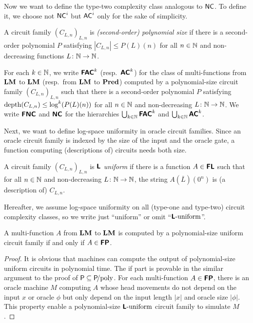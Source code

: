 \documentclass[envcountsame,orivec,oribibl]{llncs}
\begin{document}
Now we want to define the type-two complexity class analogous to $\mathsf{NC}$.
To define it, we choose not $\mathsf{NC}^i$ but $\mathsf{AC}^i$ 
only for the sake of simplicity.

A circuit family $(C_{L,n})_{L,n}$ is \emph{(second-order) polynomial size}
if there is a second-order polynomial $P$ satisfying
$|C_{L,n}| \le P(L)(n)$ for all $n \in \mathbb N$ and non-decreasing functions
$L \colon \mathbb N \to \mathbb N$.


\begin{definition}
 For each $k \in \mathbb N$, 
 we write $\text{\bfseries \sffamily \upshape FAC}^k$ (resp.\ $\text{\bfseries \sffamily \upshape AC}^k$) for the class of 
 multi-functions from $\mathbf{LM}$ to $\mathbf{LM}$ (resp.\ from $\mathbf{LM}$ to $\mathbf{Pred}$) computed by
 a polynomial-size circuit family $(C_{L,n})_{L,n}$ such that
 there is a second-order polynomial $P$ satisfying
 $\mathop{\rm depth}(C_{L,n}) \le \log^k(P(L)(n))$ 
 for all $n \in \mathbb N$ and non-decreasing
 $L \colon \mathbb N \to \mathbb N$.
 We write $\text{\bfseries \sffamily \upshape FNC}$ and $\text{\bfseries \sffamily \upshape NC}$ for the hierarchies
 $\bigcup_{k \in \mathbb N} \text{\bfseries \sffamily \upshape FAC}^k$ and $\bigcup_{k \in \mathbb N} \text{\bfseries \sffamily \upshape AC}^k$.
\end{definition}

Next, we want to define log-space uniformity in oracle circuit families.
Since an oracle circuit family is indexed by the size of the input and the oracle gate,
a function computing (descriptions of) circuits needs both size.

\begin{definition}
A circuit family $(C_{L,n})_{L,n}$ is \emph{$\text{\bfseries \sffamily \upshape L}$ uniform} if there is a function $A \in \text{\bfseries \sffamily \upshape FL}$ 
such that for all $n \in \mathbb N$ and non-decreasing $L \colon \mathbb N \to \mathbb N$, 
the string $A (\overline L) (0^n)$ is (a description of) $C_{L,n}$. 
\end{definition}

Hereafter, we assume log-space uniformity on all (type-one and type-two) 
circuit complexity classes, so we write just ``uniform'' or omit ``$\text{\bfseries \sffamily \upshape L}\text{-uniform}$''.

\begin{theorem}
\label{theorem:P-equals-L-uniform-P-poly}
A multi-function $A$ from $\mathbf{LM}$ to $\mathbf{LM}$ is computed by a polynomial-size
uniform circuit family if and only if $A \in \text{\bfseries \sffamily \upshape FP}$.
\end{theorem}

\begin{proof}
 It is obvious that machines can compute the output of
 polynomial-size uniform circuits in polynomial time.
 The if part is provable in the similar argument to the proof of
 $\mathsf{P} \subseteq \mathsf{P}\!\text{/poly}$.
 For each multi-function $A \in \text{\bfseries \sffamily \upshape FP}$, there is an oracle machine $M$
 computing $A$ whose head movements do not depend on the input $x$ or oracle
 $\phi$ but only depend on the input length $|x|$ and oracle size $|\phi|$.
 This property enable a polynomial-size $\text{\bfseries \sffamily \upshape L}\text{-uniform}$ circuit family to simulate $M$.
\end{proof}
\end{document}
